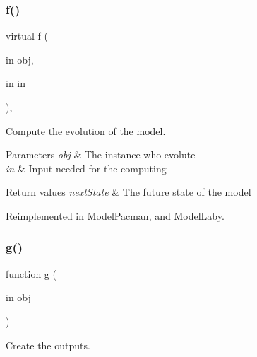 \subsubsection{\texorpdfstring{f()}{f()}\hspace{0.1cm}{\footnotesize\ttfamily [2/2]}}
{\footnotesize\ttfamily virtual f (\begin{DoxyParamCaption}\item[{in}]{obj,  }\item[{in}]{in }\end{DoxyParamCaption})\hspace{0.3cm}{\ttfamily [virtual]}, {\ttfamily [inherited]}}



Compute the evolution of the model. 


\begin{DoxyParams}{Parameters}
{\em obj} & The instance who evolute \\
\hline
{\em in} & Input needed for the computing \\
\hline
\end{DoxyParams}

\begin{DoxyRetVals}{Return values}
{\em next\+State} & The future state of the model \\
\hline
\end{DoxyRetVals}


Reimplemented in \hyperlink{class_model_pacman_a6f3b146c92a207e95690d08975e1e072}{Model\+Pacman}, and \hyperlink{class_model_laby_a6f3b146c92a207e95690d08975e1e072}{Model\+Laby}.

\mbox{\label{class_stop_condition_a07dadfabe92bf9a144b8a862720e7746}} 
\subsubsection{\texorpdfstring{g()}{g()}}
{\footnotesize\ttfamily \hyperlink{_plan__desuma_functions__2_players_8m_ac2ffb26d6f42d3bbcd7847b0873403f4}{function} g (\begin{DoxyParamCaption}\item[{in}]{obj }\end{DoxyParamCaption})\hspace{0.3cm}{\ttfamily [virtual]}}



Create the outputs. 


